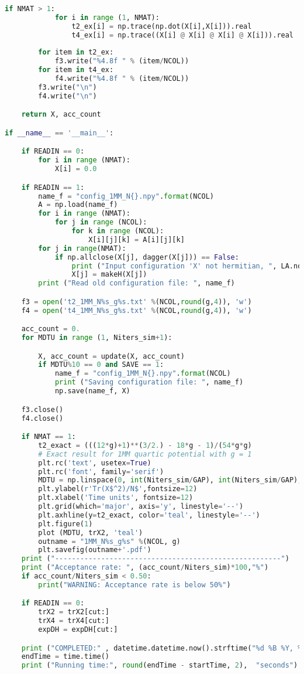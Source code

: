 \begin{lstlisting}[language=Python]
        if NMAT > 1:
            for i in range (1, NMAT):
                t2_ex[i] = np.trace(np.dot(X[i],X[i])).real
                t4_ex[i] = np.trace((X[i] @ X[i] @ X[i] @ X[i])).real
        
        for item in t2_ex:
            f3.write("%4.8f " % (item/NCOL))
        for item in t4_ex:
            f4.write("%4.8f " % (item/NCOL))
        f3.write("\n")
        f4.write("\n")

    return X, acc_count

if __name__ == '__main__':

    if READIN == 0:
        for i in range (NMAT): 
            X[i] = 0.0  

    if READIN == 1:
        name_f = "config_1MM_N{}.npy".format(NCOL)
        A = np.load(name_f)
        for i in range (NMAT):
            for j in range (NCOL):
                for k in range (NCOL):
                    X[i][j][k] = A[i][j][k]
        for j in range(NMAT):
            if np.allclose(X[j], dagger(X[j])) == False:
                print ("Input configuration 'X' not hermitian, ", LA.norm(X[j] - dagger(X[j])), "making it so")
                X[j] = makeH(X[j])
        print ("Read old configuration file: ", name_f)

    f3 = open('t2_1MM_N%s_g%s.txt' %(NCOL,round(g,4)), 'w')
    f4 = open('t4_1MM_N%s_g%s.txt' %(NCOL,round(g,4)), 'w')

    acc_count = 0.
    for MDTU in range (1, Niters_sim+1):

        X, acc_count = update(X, acc_count)
        if MDTU%10 == 0 and SAVE == 1:
            name_f = "config_1MM_N{}.npy".format(NCOL)
            print ("Saving configuration file: ", name_f)
            np.save(name_f, X)

    f3.close()
    f4.close()

    if NMAT == 1: 
        t2_exact = (((12*g)+1)**(3/2.) - 18*g - 1)/(54*g*g)
        # Exact result for 1MM quartic potential with g = 1
        plt.rc('text', usetex=True)
        plt.rc('font', family='serif')
        MDTU = np.linspace(0, int(Niters_sim/GAP), int(Niters_sim/GAP), endpoint=True)
        plt.ylabel(r'Tr(X$^2)/N$',fontsize=12)
        plt.xlabel('Time units', fontsize=12)
        plt.grid(which='major', axis='y', linestyle='--')
        plt.axhline(y=t2_exact, color='teal', linestyle='--')
        plt.figure(1)
        plot (MDTU, trX2, 'teal') 
        outname = "1MM_N%s_g%s" %(NCOL, g)
        plt.savefig(outname+'.pdf')
    print ("------------------------------------------------------")
    print ("Acceptance rate: ", (acc_count/Niters_sim)*100,"%") 
    if acc_count/Niters_sim < 0.50:
        print("WARNING: Acceptance rate is below 50%")

    if READIN == 0:
        trX2 = trX2[cut:]
        trX4 = trX4[cut:]
        expDH = expDH[cut:] 

    print ("COMPLETED:" , datetime.datetime.now().strftime("%d %B %Y, %H:%M:%S"))
    endTime = time.time() 
    print ("Running time:", round(endTime - startTime, 2),  "seconds")
\end{lstlisting}